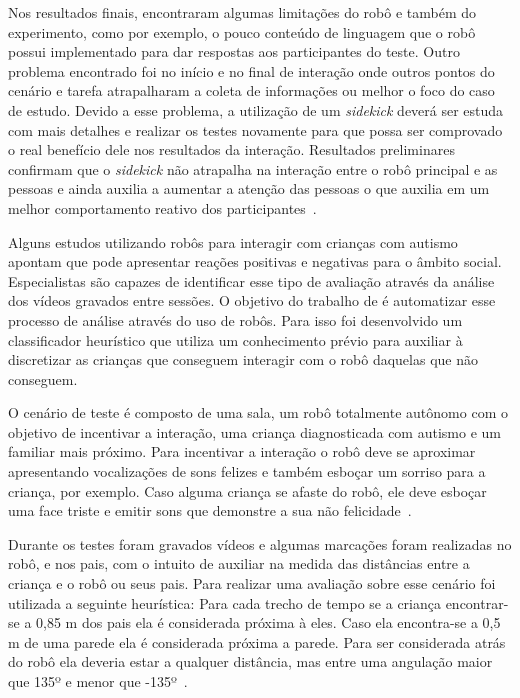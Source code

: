 Nos resultados finais,  encontraram algumas limitações do robô e também do experimento, como por exemplo, o pouco conteúdo de linguagem que o robô possui implementado para dar respostas aos participantes do teste. Outro problema encontrado foi no início e no final de interação onde outros pontos do cenário e tarefa atrapalharam a coleta de informações ou melhor o foco do caso de estudo. Devido a esse problema, a utilização de um \emph{sidekick} deverá ser estuda com mais detalhes e realizar os testes novamente para que possa ser comprovado o real benefício dele nos resultados da interação. Resultados preliminares confirmam que o \emph{sidekick} não atrapalha na interação entre o robô principal e as pessoas e ainda auxilia a aumentar a atenção das pessoas o que auxilia em um melhor comportamento reativo dos participantes~\cite{Vazquez:2014}.

Alguns estudos utilizando robôs para interagir com crianças com autismo apontam que pode apresentar reações positivas e negativas para o âmbito social. Especialistas são capazes de identificar esse tipo de avaliação através da análise dos vídeos gravados entre sessões. O objetivo do trabalho de  é automatizar esse processo de análise através do uso de robôs. Para isso foi desenvolvido um classificador heurístico que utiliza um conhecimento prévio para auxiliar à discretizar as crianças que conseguem interagir com o robô daquelas que não conseguem.

O cenário de teste é composto de uma sala, um robô totalmente autônomo com o objetivo de incentivar a interação, uma criança diagnosticada com autismo e um familiar mais próximo. Para incentivar a interação o robô deve se aproximar apresentando vocalizações de sons felizes e também esboçar um sorriso para a criança, por exemplo. Caso alguma criança se afaste do robô, ele deve esboçar uma face triste e emitir sons que demonstre a sua não felicidade~\cite{Feil-Seifer:2010}.

Durante os testes foram gravados vídeos e algumas marcações foram realizadas no robô, e nos pais, com o intuito de auxiliar na medida das distâncias entre a criança e o robô ou seus pais. Para realizar uma avaliação sobre esse cenário foi utilizada a seguinte heurística: Para cada trecho de tempo se a criança encontrar-se a 0,85 m dos pais ela é considerada próxima à eles. Caso ela encontra-se a 0,5 m de uma parede ela é considerada próxima a parede. Para ser considerada atrás do robô ela deveria estar a qualquer distância, mas entre uma angulação maior que 135º e menor que -135º~\cite{Feil-Seifer:2010}.

